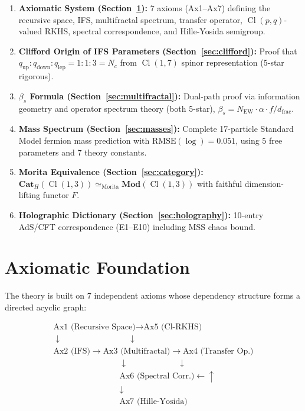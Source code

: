 \documentclass[12pt,a4paper]{article}
\newcommand{\Cl}{\operatorname{Cl}}
\newcommand{\Cat}{\mathbf{Cat}}
\newcommand{\Mod}{\mathbf{Mod}}
\begin{document}
\begin{enumerate}
  \item \textbf{Axiomatic System (Section~\ref{sec:axioms}):} 7 axioms (Ax1--Ax7) 
  defining the recursive space, IFS, multifractal spectrum, transfer operator, 
  $\Cl(p,q)$-valued RKHS, spectral correspondence, and Hille-Yosida semigroup.

  \item \textbf{Clifford Origin of IFS Parameters (Section~\ref{sec:clifford}):} 
  Proof that $q_{\text{up}}:q_{\text{down}}:q_{\text{lep}} = 1:1:3 = N_c$ 
  from $\Cl(1,7)$ spinor representation (5-star rigorous).

  \item \textbf{$\beta_s$ Formula (Section~\ref{sec:multifractal}):} Dual-path proof via 
  information geometry and operator spectrum theory (both 5-star), 
  $\beta_s = N_{\text{EW}} \cdot \alpha \cdot f / d_{\text{frac}}$.

  \item \textbf{Mass Spectrum (Section~\ref{sec:masses}):} Complete 17-particle 
  Standard Model fermion mass prediction with $\text{RMSE}(\log) = 0.051$, 
  using 5 free parameters and 7 theory constants.

  \item \textbf{Morita Equivalence (Section~\ref{sec:category}):} 
  $\Cat_H(\Cl(1,3)) \simeq_{\text{Morita}} \Mod(\Cl(1,3))$ with 
  faithful dimension-lifting functor $F$.

  \item \textbf{Holographic Dictionary (Section~\ref{sec:holography}):} 
  10-entry AdS/CFT correspondence (E1--E10) including MSS chaos bound.
\end{enumerate}

\section{Axiomatic Foundation}
\label{sec:axioms}

The theory is built on 7 independent axioms whose dependency structure forms 
a directed acyclic graph:

\[
\begin{array}{c}
\text{Ax1 (Recursive Space)} \longrightarrow \text{Ax5 (Cl-RKHS)} \\
\downarrow \qquad\qquad\qquad\qquad \downarrow \\
\text{Ax2 (IFS)} \longrightarrow \text{Ax3 (Multifractal)} \longrightarrow \text{Ax4 (Transfer Op.)} \\
\qquad\qquad\qquad\qquad \downarrow \qquad\qquad\qquad \downarrow \\
\qquad\qquad\qquad\qquad \text{Ax6 (Spectral Corr.)} \longleftarrow\!\!\!\!\!\!\uparrow \\
\qquad\qquad\qquad\qquad \downarrow \\
\qquad\qquad\qquad\qquad \text{Ax7 (Hille-Yosida)}
\end{array}
\]
\end{document}
